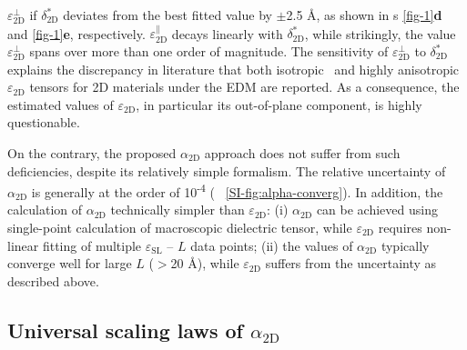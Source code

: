 $\varepsilon_{\mathrm{2D}}^{\perp}$ if $\delta^{*}_{\mathrm{2D}}$
deviates from the best fitted value by $\pm{}$2.5 \AA{}, as shown in
s \autoref{fig-1}\textbf{d} and \autoref{fig-1}\textbf{e},
respectively. $\varepsilon_{\mathrm{2D}}^{\parallel}$ decays linearly
with $\delta^{*}_{\mathrm{2D}}$,
while strikingly, the value $\varepsilon_{\mathrm{2D}}^{\perp}$ spans
over more than one order of magnitude. The sensitivity of
$\varepsilon_{\mathrm{2D}}^{\perp}$ to $\delta^{*}_{\mathrm{2D}}$
explains the discrepancy in literature that both
isotropic~\cite{Sohier_2016_2D_eps} and highly
anisotropic~\cite{Matthes_2016_effective_PRB,Laturia_2018_2D_eps}
$\varepsilon_{\mathrm{2D}}$ tensors for 2D materials under the EDM are
reported. As a consequence, the estimated values of
$\varepsilon_{\mathrm{2D}}$, in particular its out-of-plane component,
is highly questionable.

On the contrary, the proposed $\alpha_{\mathrm{2D}}$ approach does not
suffer from such deficiencies, despite its relatively simple
formalism. The relative uncertainty of $\alpha_{\mathrm{2D}}$ is
generally at the order of 10\textsuperscript{-4} (
~\autoref{SI-fig:alpha-converg}). In addition, the calculation of
$\alpha_{\mathrm{2D}}$ technically simpler than
$\varepsilon_{\mathrm{2D}}$: (i) $\alpha_{\mathrm{2D}}$ can be
achieved using single-point calculation of macroscopic dielectric
tensor, while $\varepsilon_{\mathrm{2D}}$ requires non-linear fitting
of multiple $\varepsilon_{\mathrm{SL}}$ -- $L$ data points; (ii) the
values of $\alpha_{\mathrm{2D}}$ typically converge well for large $L$
($>$20 \AA{}), while $\varepsilon_{\mathrm{2D}}$ suffers from the
uncertainty as described above.



\subsection{Universal scaling laws of $\alpha_{\mathrm{2D}}$}
\label{sec:diel-univ-scal-laws}

